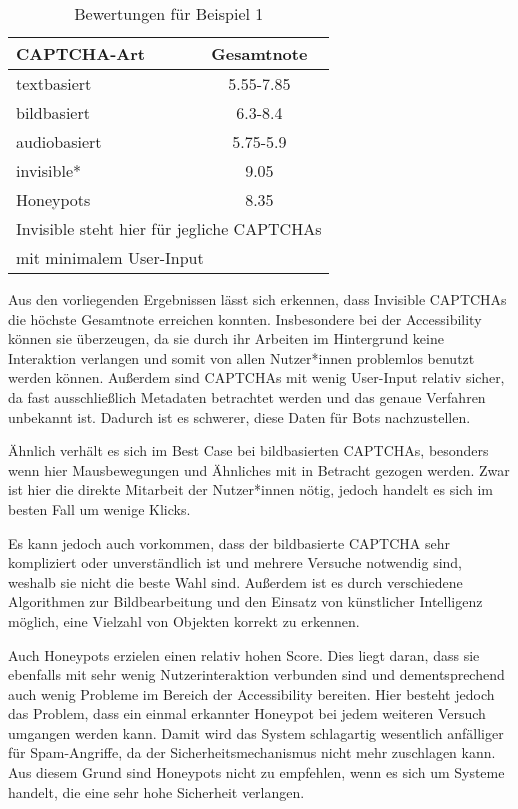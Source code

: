 \begin{table}[h!]
    \caption{Bewertungen für Beispiel 1}
    \begin{center}
        \begin{tabular}{l|c}
            CAPTCHA-Art                       & Gesamtnote \\\hline
            textbasiert            &  5.55-7.85       \\
            bildbasiert                   &  6.3-8.4      \\
            audiobasiert        & 5.75-5.9         \\
            invisible*                      & 9.05         \\
            Honeypots       & 8.35\\
            \multicolumn{2}{l}{\footnotesize * Invisible steht hier für jegliche CAPTCHAs} \\
            \multicolumn{2}{l}{\footnotesize \space \space mit minimalem User-Input}
        \end{tabular}
    \end{center}
\end{table}

Aus den vorliegenden Ergebnissen lässt sich erkennen, dass Invisible \linebreak CAPTCHAs die höchste Gesamtnote erreichen konnten.
Insbesondere bei der Accessibility können sie überzeugen, 
da sie durch ihr Arbeiten im Hintergrund keine Interaktion verlangen und somit von allen Nutzer*innen problemlos benutzt werden können.
Außerdem sind CAPTCHAs mit wenig User-Input relativ sicher, da fast ausschließlich Metadaten betrachtet werden und das genaue Verfahren unbekannt ist.
Dadurch ist es schwerer, diese Daten für Bots nachzustellen.

Ähnlich verhält es sich im Best Case bei bildbasierten CAPTCHAs, besonders wenn hier Mausbewegungen und Ähnliches mit in Betracht gezogen werden.
Zwar ist hier die direkte Mitarbeit der Nutzer*innen nötig, jedoch handelt es sich im besten Fall um wenige Klicks. 

Es kann jedoch auch vorkommen, dass der bildbasierte CAPTCHA sehr kompliziert oder unverständlich ist und mehrere Versuche notwendig sind,
weshalb sie nicht die beste Wahl sind.
Außerdem ist es durch verschiedene Algorithmen zur Bildbearbeitung und den Einsatz von künstlicher Intelligenz möglich,
eine Vielzahl von Objekten korrekt zu erkennen.

Auch Honeypots erzielen einen relativ hohen Score.
Dies liegt daran, dass sie ebenfalls mit sehr wenig Nutzerinteraktion verbunden sind
und dementsprechend auch wenig Probleme im Bereich der Accessibility bereiten.
Hier besteht jedoch das Problem, dass ein einmal erkannter Honeypot bei jedem weiteren Versuch umgangen werden kann.
Damit wird das System schlagartig wesentlich anfälliger für Spam-Angriffe, da der Sicherheitsmechanismus nicht mehr zuschlagen kann.
Aus diesem Grund sind Honeypots nicht zu empfehlen, wenn es sich um Systeme handelt, die eine sehr hohe Sicherheit verlangen.

